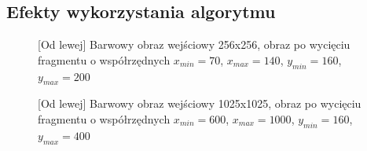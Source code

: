 \documentclass[a4paper,12pt, titlepage]{report}
\begin{document}
\subsection*{Efekty wykorzystania algorytmu}
\begin{figure}[h]
    \centering
    \caption{[Od lewej] Barwowy obraz wejściowy 256x256, obraz po wycięciu fragmentu o współrzędnych \(x_{min}=70\), \(x_{max}=140\), \(y_{min}=160\), \(y_{max}=200\)}%
    \label{fig:geo_after_grey1}%
\end{figure}
\FloatBarrier
\begin{figure}[h]
    \centering
    \caption{[Od lewej] Barwowy obraz wejściowy 1025x1025, obraz po wycięciu fragmentu o współrzędnych \(x_{min}=600\), \(x_{max}=1000\), \(y_{min}=160\), \(y_{max}=400\)}%
    \label{fig:geo_after_grey1}%
\end{figure}
\end{document}
